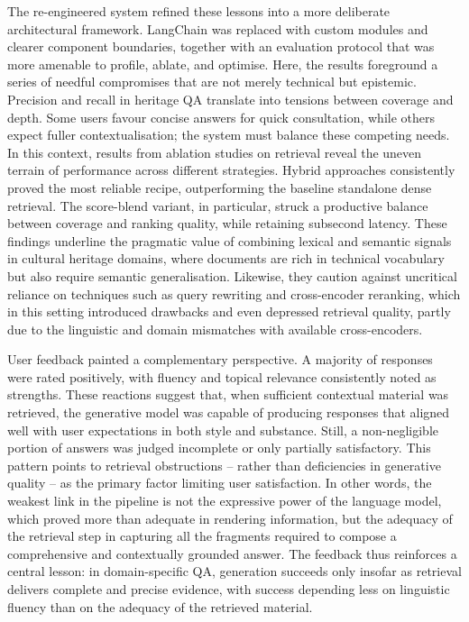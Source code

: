 \begin{spacing}{1.5}
The re-engineered system refined these lessons into a more deliberate architectural framework. LangChain was replaced with custom modules and clearer component boundaries, together with an evaluation protocol that was more amenable to profile, ablate, and optimise. Here, the results foreground a series of needful compromises that are not merely technical but epistemic. Precision and recall in heritage QA translate into tensions between coverage and depth. Some users favour concise answers for quick consultation, while others expect fuller contextualisation; the system must balance these competing needs. In this context, results from ablation studies on retrieval reveal the uneven terrain of performance across different strategies. Hybrid approaches consistently proved the most reliable recipe, outperforming the baseline standalone dense retrieval. The score-blend variant, in particular, struck a productive balance between coverage and ranking quality, while retaining subsecond latency. These findings underline the pragmatic value of combining lexical and semantic signals in cultural heritage domains, where documents are rich in technical vocabulary but also require semantic generalisation. Likewise, they caution against uncritical reliance on techniques such as query rewriting and cross-encoder reranking, which in this setting introduced drawbacks and even depressed retrieval quality, partly due to the linguistic and domain mismatches with available cross-encoders.

User feedback painted a complementary perspective. A majority of responses were rated positively, with fluency and topical relevance consistently noted as strengths. These reactions suggest that, when sufficient contextual material was retrieved, the generative model was capable of producing responses that aligned well with user expectations in both style and substance. Still, a non-negligible portion of answers was judged incomplete or only partially satisfactory. This pattern points to retrieval obstructions -- rather than deficiencies in generative quality -- as the primary factor limiting user satisfaction. In other words, the weakest link in the pipeline is not the expressive power of the language model, which proved more than adequate in rendering information, but the adequacy of the retrieval step in capturing all the fragments required to compose a comprehensive and contextually grounded answer. The feedback thus reinforces a central lesson: in domain-specific QA, generation succeeds only insofar as retrieval delivers complete and precise evidence, with success depending less on linguistic fluency than on the adequacy of the retrieved material.


\end{spacing}
